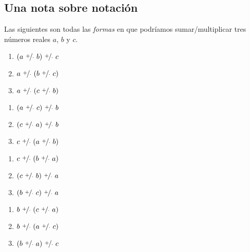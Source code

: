 \documentclass[11pt]{article}
\begin{document}
\subsection*{Una nota sobre notación}

Las siguientes son todas las \textit{formas} en que podríamos sumar/multiplicar tres números reales $a$, $b$ y $c$.
\begin{center}
 \begin{minipage}[c]{.2\linewidth}
  \begin{enumerate}[label=\roman*.]
   \item $(a \ \nicefrac{+}{\cdot} \ b) \ \nicefrac{+}{\cdot} \ c$
   \item $a \ \nicefrac{+}{\cdot} \ (b \ \nicefrac{+}{\cdot} \ c)$
   \item $a \ \nicefrac{+}{\cdot} \ (c \ \nicefrac{+}{\cdot} \ b)$
  \end{enumerate}
  \end{minipage}%
  \begin{minipage}[c]{.2\linewidth}
   \begin{enumerate}[start=4,label=\roman*.]
    \item $(a \ \nicefrac{+}{\cdot} \ c) \ \nicefrac{+}{\cdot} \ b$
    \item $(c \ \nicefrac{+}{\cdot} \ a) \ \nicefrac{+}{\cdot} \ b$
    \item $c \ \nicefrac{+}{\cdot} \ (a \ \nicefrac{+}{\cdot} \ b)$
   \end{enumerate}
   \end{minipage}%
  \begin{minipage}[c]{.2\linewidth}
   \begin{enumerate}[start=7,label=\roman*.]
   \item $c \ \nicefrac{+}{\cdot} \ (b \ \nicefrac{+}{\cdot} \ a)$
   \item $(c \ \nicefrac{+}{\cdot} \ b) \ \nicefrac{+}{\cdot} \ a$
   \item $(b \ \nicefrac{+}{\cdot} \ c) \ \nicefrac{+}{\cdot} \ a$
  \end{enumerate}
  \end{minipage}
  \begin{minipage}[c]{.2\linewidth}
   \begin{enumerate}[start=10,label=\roman*.]
   \item $b \ \nicefrac{+}{\cdot} \ (c \ \nicefrac{+}{\cdot} \ a)$
   \item $b \ \nicefrac{+}{\cdot} \ (a \ \nicefrac{+}{\cdot} \ c)$
   \item $(b \ \nicefrac{+}{\cdot} \ a) \ \nicefrac{+}{\cdot} \ c$
  \end{enumerate}
  \end{minipage}
\end{center}
\end{document}
